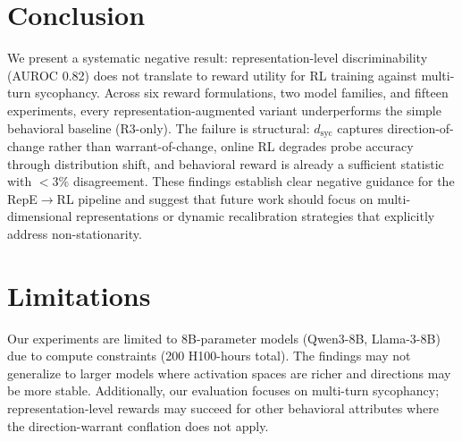 \documentclass[11pt,a4paper]{article}
\begin{document}
\section{Conclusion}

We present a systematic negative result: representation-level discriminability (AUROC 0.82) does not translate to reward utility for RL training against multi-turn sycophancy. Across six reward formulations, two model families, and fifteen experiments, every representation-augmented variant underperforms the simple behavioral baseline (R3-only). The failure is structural: $d_\text{syc}$ captures direction-of-change rather than warrant-of-change, online RL degrades probe accuracy through distribution shift, and behavioral reward is already a sufficient statistic with $<3\%$ disagreement. These findings establish clear negative guidance for the RepE$\to$RL pipeline and suggest that future work should focus on multi-dimensional representations or dynamic recalibration strategies that explicitly address non-stationarity.

\section*{Limitations}

Our experiments are limited to 8B-parameter models (Qwen3-8B, Llama-3-8B) due to compute constraints (200 H100-hours total). The findings may not generalize to larger models where activation spaces are richer and directions may be more stable. Additionally, our evaluation focuses on multi-turn sycophancy; representation-level rewards may succeed for other behavioral attributes where the direction-warrant conflation does not apply.
\end{document}
